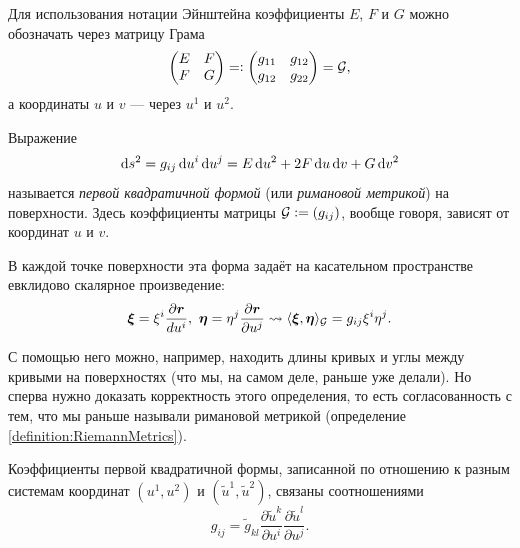 Для использования нотации Эйнштейна коэффициенты $E$, $F$ и $G$ можно обозначать через матрицу Грама
\[
	\begin{pmatrix}
		E & F\\
		F & G
	\end{pmatrix} = \vcentcolon
	\begin{pmatrix}
		g_{11} & g_{12}\\
		g_{12} & g_{22}
	\end{pmatrix} = \mathcal{G},
\]
а координаты $u$ и $v$ --- через $u^1$ и $u^2$.

\begin{definition}
	Выражение
	\[
		\mathop{}\!\mathrm{d} s^2 = g_{ij}\mathop{}\!\mathrm{d} u^i\mathop{}\!\mathrm{d} u^j = E\mathop{}\!\mathrm{d} u^2 + 2F\mathop{}\!\mathrm{d} u\mathop{}\!\mathrm{d} v + G\mathop{}\!\mathrm{d} v^2
	\]
	называется \textit{первой квадратичной формой} (или \textit{римановой метрикой}) на поверхности. Здесь коэффициенты матрицы $\mathcal{G} \vcentcolon = (g_{ij})$, вообще говоря, зависят от координат $u$ и $v$.
\end{definition}

В каждой точке поверхности эта форма задаёт на касательном пространстве евклидово скалярное произведение:
\[
	\vec{\xi} = \xi^i\frac{\partial \vec{r}}{du^i},\ \vec{\eta} = \eta^j\frac{\partial \vec{r}}{\partial u^j} \leadsto \langle\vec{\xi}, \vec{\eta}\rangle_\G = g_{ij}\xi^i\eta^j.
\]

С помощью него можно, например, находить длины кривых и углы между кривыми на поверхностях (что мы, на самом деле, раньше уже делали). Но сперва нужно доказать корректность этого определения, то есть согласованность с тем, что мы раньше называли римановой метрикой (определение \ref{definition:RiemannMetrics}).

\begin{proposition}
	Коэффициенты первой квадратичной формы, записанной по отношению к разным системам координат $(u^1, u^2)$ и $(\widetilde{u}^1, \widetilde{u}^2)$, связаны соотношениями\footnotemark
	\begin{equation} \label{eq:QTensorLaw}
		g_{ij} = \widetilde{g}_{kl}\frac{\partial\widetilde{u}^k}{\partial u^i}\frac{\partial \widetilde{u}^l}{\partial u^j}.
	\end{equation}
\end{proposition}


